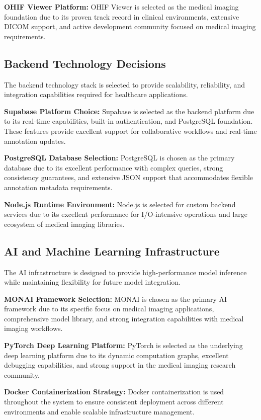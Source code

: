 \textbf{OHIF Viewer Platform:} OHIF Viewer is selected as the medical imaging foundation due to its proven track record in clinical environments, extensive DICOM support, and active development community focused on medical imaging requirements.

\subsection{Backend Technology Decisions}

The backend technology stack is selected to provide scalability, reliability, and integration capabilities required for healthcare applications.

\textbf{Supabase Platform Choice:} Supabase is selected as the backend platform due to its real-time capabilities, built-in authentication, and PostgreSQL foundation. These features provide excellent support for collaborative workflows and real-time annotation updates.

\textbf{PostgreSQL Database Selection:} PostgreSQL is chosen as the primary database due to its excellent performance with complex queries, strong consistency guarantees, and extensive JSON support that accommodates flexible annotation metadata requirements.

\textbf{Node.js Runtime Environment:} Node.js is selected for custom backend services due to its excellent performance for I/O-intensive operations and large ecosystem of medical imaging libraries.

\subsection{AI and Machine Learning Infrastructure}

The AI infrastructure is designed to provide high-performance model inference while maintaining flexibility for future model integration.

\textbf{MONAI Framework Selection:} MONAI is chosen as the primary AI framework due to its specific focus on medical imaging applications, comprehensive model library, and strong integration capabilities with medical imaging workflows.

\textbf{PyTorch Deep Learning Platform:} PyTorch is selected as the underlying deep learning platform due to its dynamic computation graphs, excellent debugging capabilities, and strong support in the medical imaging research community.

\textbf{Docker Containerization Strategy:} Docker containerization is used throughout the system to ensure consistent deployment across different environments and enable scalable infrastructure management.

